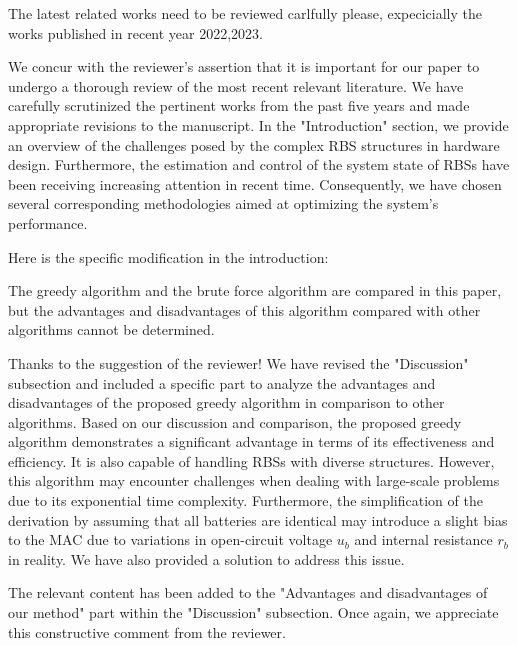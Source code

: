 \reviewer
\begin{revcomment}
  The latest related works need to be reviewed carlfully please, expecicially the works published in recent year 2022,2023.
\end{revcomment}
\begin{revresponse}

We concur with the reviewer's assertion that it is important for our paper to undergo a thorough review of the most recent relevant literature. 
We have carefully scrutinized the pertinent works from the past five years and made appropriate revisions to the manuscript.
In the "Introduction" section, we provide an overview of the challenges posed by the complex RBS structures in hardware design. 
Furthermore, the estimation and control of the system state of RBSs have been receiving increasing attention in recent time.
Consequently, we have chosen several corresponding methodologies aimed at optimizing the system's performance.


Here is the specific modification in the introduction:
\begin{changes}
\end{changes}

\end{revresponse}

\begin{revcomment}
  The greedy algorithm and the brute force algorithm are compared in this paper, but the advantages and disadvantages of this algorithm compared with other algorithms cannot be determined.
\end{revcomment}
\begin{revresponse}

Thanks to the suggestion of the reviewer! 
We have revised the "Discussion" subsection and included a specific part to analyze the advantages and disadvantages of the proposed greedy algorithm in comparison to other algorithms. 
Based on our discussion and comparison, the proposed greedy algorithm demonstrates a significant advantage in terms of its effectiveness and efficiency.
It is also capable of handling RBSs with diverse structures. 
However, this algorithm may encounter challenges when dealing with large-scale problems due to its exponential time complexity.
Furthermore, the simplification of the derivation by assuming that all batteries are identical may introduce a slight bias to the MAC due to variations in open-circuit voltage $u_b$ and internal resistance $r_b$ in reality.
We have also provided a solution to address this issue.


The relevant content has been added to the "Advantages and disadvantages of our method" part within the "Discussion" subsection. 
Once again, we appreciate this constructive comment from the reviewer.

\end{revresponse}

